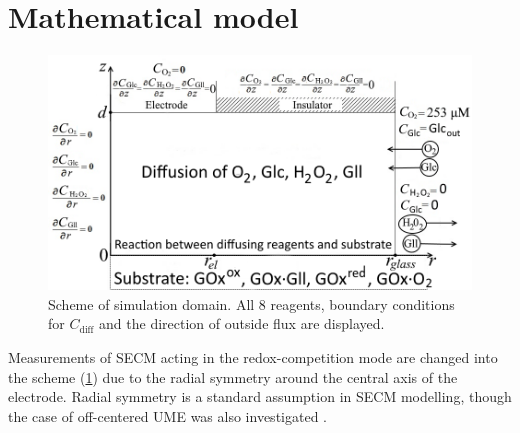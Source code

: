 \section{Mathematical model}  \label{sec:reakc_math}

\begin{figure}[ht!]
\centering
\includegraphics[width=1\linewidth]{chapter_1/Model_domain.png}
\caption{Scheme of simulation domain. All 8 reagents, boundary conditions for $C_{\text{diff}}$ and the direction of outside flux are displayed.}
\label{fig:Domain}
\end{figure}

Measurements of SECM acting in the redox-competition mode are changed into the scheme (\ref{fig:Domain}) due to the radial symmetry around the central axis of the electrode. Radial symmetry is a standard assumption in SECM modelling, though the case of off-centered UME was also investigated \cite{cornut2011accurate}.

